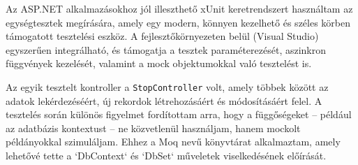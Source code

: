 Az ASP.NET alkalmazásokhoz jól illeszthető xUnit keretrendszert használtam az egységtesztek megírására, amely egy modern, könnyen kezelhető és széles körben támogatott tesztelési eszköz. A fejlesztőkörnyezeten belül (Visual Studio) egyszerűen integrálható, és támogatja a tesztek paraméterezését, aszinkron függvények kezelését, valamint a mock objektumokkal való tesztelést is.

Az egyik tesztelt kontroller a \texttt{StopController} volt, amely többek között az adatok lekérdezéséért, új rekordok létrehozásáért és módosításáért felel. A tesztelés során különös figyelmet fordítottam arra, hogy a függőségeket – például az adatbázis kontextust – ne közvetlenül használjam, hanem mockolt példányokkal szimuláljam. Ehhez a Moq nevű könyvtárat alkalmaztam, amely lehetővé tette a `DbContext` és `DbSet` műveletek viselkedésének előírását.
